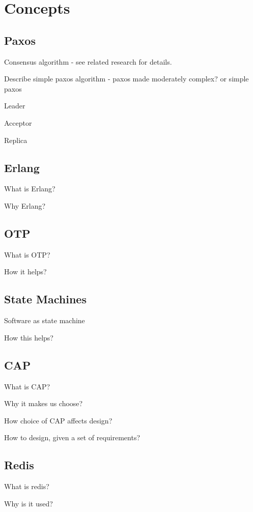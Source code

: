 \chapter{Concepts}
\label{chapter:concepts}

\section{Paxos}

Consensus algorithm - see related research for details.

Describe simple paxos algorithm - paxos made moderately complex? or simple paxos

Leader

Acceptor

Replica


\section{Erlang}

What is Erlang?

Why Erlang?

\section{OTP}

What is OTP?

How it helps?

\section{State Machines}

Software as state machine

How this helps?

\section{CAP}

What is CAP?

Why it makes us choose?

How choice of CAP affects design?

How to design, given a set of requirements?

\section{Redis}

What is redis?

Why is it used?

